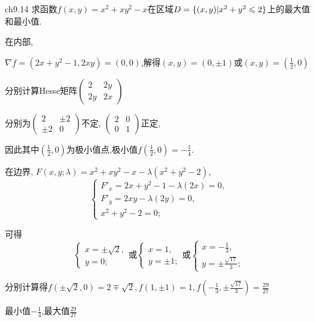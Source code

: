 \begin{exercise}{ch9.14}
    求函数$f(x,y)=x^2+xy^2-x$在区域$D=\{(x,y)|x^2+y^2\leqslant 2\}$上的最大值和最小值.
\end{exercise}
\begin{solution}
    在内部,

    $\nabla f=(2x+y^2-1,2xy)=(0,0)$,解得$(x,y)=(0,\pm1)$或$(x,y)=(\frac{1}{2},0)$

    分别计算Hesse矩阵$\begin{pmatrix}
        2&2y\\
        2y&2x
    \end{pmatrix}$

    分别为$\begin{pmatrix}
        2&\pm2\\
        \pm2&0
    \end{pmatrix}$不定,
    $\begin{pmatrix}
        2&0\\
        0&1
    \end{pmatrix}$正定,
    
    因此其中$(\frac{1}{2},0)$为极小值点,极小值$f(\frac{1}{2},0)=-\frac{1}{4}$.

    在边界,
    $F(x,y;\lambda)=x^2+xy^2-x-\lambda(x^2+y^2-2)$,
    $$\begin{cases}
        F'_x=2x+y^2-1-\lambda(2x)=0,\\
        F'_y=2xy-\lambda(2y)=0,\\
        x^2+y^2-2=0;
    \end{cases}$$

    可得$$\begin{cases}
        x=\pm\sqrt{2},\\
        y=0;
    \end{cases}
    \text{或}
    \begin{cases}
        x=1,\\
        y=\pm1;
    \end{cases}
    \text{或}
    \begin{cases}
        x=-\frac{1}{3},\\
        y=\pm\frac{\sqrt{17}}{3};
    \end{cases}$$

    分别计算得$f(\pm\sqrt{2},0)=2\mp \sqrt{2},f(1,\pm 1)=1,f(-\frac{1}{3},\pm\frac{\sqrt{17}}{3})=\frac{29}{27}$

    最小值$-\frac{1}{4}$,最大值$\frac{29}{27}$
\end{solution}

